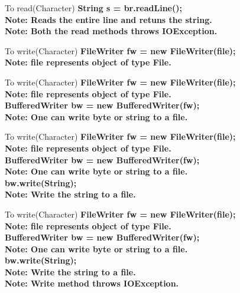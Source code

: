 \documentclass[aspectratio=169,14pt,usenames,dvipsnames]{beamer}
\begin{document}
\begin{frame}{To read(Character)}
\textbf{String s = br.readLine();}\\
\textbf{Note: Reads the entire line and retuns the string.}\\
\vspace{1em}
\textbf{Note: Both the read methods throws IOException.}\\
\end{frame}

\begin{frame}{To write(Character)}
\textbf{FileWriter fw = new FileWriter(file);}\\
\textbf{Note: file represents object of type File.}\\
\end{frame}

\begin{frame}{To write(Character)}
\textbf{FileWriter fw = new FileWriter(file);}\\
\textbf{Note: file represents object of type File.}\\
\vspace{1em}
\textbf{BufferedWriter bw = new BufferedWriter(fw);}\\
\textbf{Note: One can write byte or string to a file.}\\
\end{frame}

\begin{frame}{To write(Character)}
\textbf{FileWriter fw = new FileWriter(file);}\\
\textbf{Note: file represents object of type File.}\\
\vspace{1em}
\textbf{BufferedWriter bw = new BufferedWriter(fw);}\\
\textbf{Note: One can write byte or string to a file.}\\
\vspace{1em}
\textbf{bw.write(String);}\\
\textbf{Note: Write the string to a file.}\\
\end{frame}

\begin{frame}{To write(Character)}
\textbf{FileWriter fw = new FileWriter(file);}\\
\textbf{Note: file represents object of type File.}\\
\vspace{1em}
\textbf{BufferedWriter bw = new BufferedWriter(fw);}\\
\textbf{Note: One can write byte or string to a file.}\\
\vspace{1em}
\textbf{bw.write(String);}\\
\textbf{Note: Write the string to a file.}\\
\vspace{1em}
\textbf{Note: Write method throws IOException.}\\
\end{frame}
\end{document}
